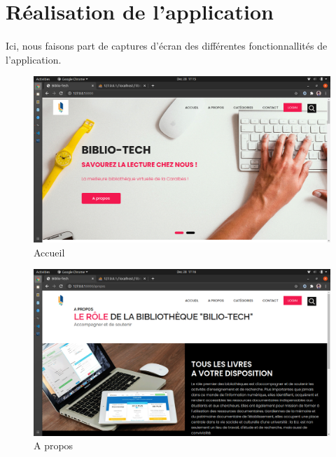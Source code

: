 \section{Réalisation de l'application}
\paragraph{}
Ici, nous faisons part de captures d'écran des différentes fonctionnallités de l'application. \par 

\begin{figure}[h]
        \centering
        \includegraphics[width=1\textwidth]{accueil}
        \caption{Accueil}
        \label{image-accueil}
\end{figure}

\begin{figure}[h]
        \centering
        \includegraphics[width=1\textwidth]{a_propos}
        \caption{A propos}
        \label{image-a_propos}
\end{figure}

